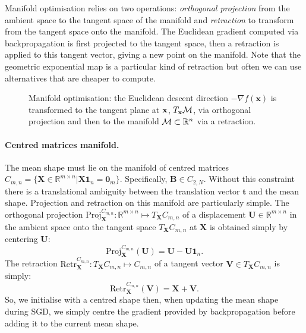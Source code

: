 \documentclass[runningheads]{llncs}
\newcommand{\R}{\mathbb{R}}
\newcommand{\Proj}{\textrm{Proj}}
\newcommand{\Retr}{\textrm{Retr}}
\begin{document}
Manifold optimisation relies on two operations: {\it orthogonal projection} from the ambient space to the tangent space of the manifold and {\it retraction} to transform from the tangent space onto the manifold. The Euclidean gradient computed via backpropagation is first projected to the tangent space, then a retraction is applied to this tangent vector, giving a new point on the manifold. Note that the geometric exponential map is a particular kind of retraction but often we can use alternatives that are cheaper to compute.


\begin{figure}[!t] \centering
\noindent{}
\caption{Manifold optimisation: the Euclidean descent direction $-\nabla f(\mathbf{x})$ is transformed to the tangent plane at ${\bf x}$, $T_{\mathbf{x}}{\cal M}$, via orthogonal projection and then to the manifold ${\cal M}\subset\R^n$ via a retraction.}
\label{fig:manifoldopt}
\end{figure}

\paragraph{Centred matrices manifold.} The mean shape must lie on the manifold of centred matrices $C_{m,n}=\{\mathbf{X}\in\R^{m\times n} | \mathbf{X1}_n=\mathbf{0}_m \}$. Specifically, $\mathbf{B}\in C_{2,N}$. Without this constraint there is a translational ambiguity between the translation vector $\mathbf{t}$ and the mean shape. Projection and retraction on this manifold are particularly simple. The orthogonal projection $\Proj_{\mathbf{X}}^{C_{m,n}}:\R^{m\times n}\mapsto T_{\mathbf{X}}C_{m,n}$ of a displacement $\mathbf{U}\in \R^{m\times n}$ in the ambient space onto the tangent space $T_{\mathbf{X}}C_{m,n}$ at $\mathbf{X}$ is obtained simply by centering $\mathbf{U}$:
\begin{equation}
\Proj_{\mathbf{X}}^{C_{m,n}}(\mathbf{U}) = \mathbf{U}-\mathbf{U1}_n.
\end{equation}
The retraction $\Retr_{\mathbf{X}}^{C_{m,n}}:T_{\mathbf{X}}C_{m,n}\mapsto C_{m,n}$ of a tangent vector $\mathbf{V}\in T_{\mathbf{X}}C_{m,n}$ is simply:
\begin{equation}
\Retr_{\mathbf{X}}^{C_{m,n}}(\mathbf{V}) = \mathbf{X}+\mathbf{V}.
\end{equation}
So, we initialise with a centred shape then, when updating the mean shape during SGD, we simply centre the gradient provided by backpropagation before adding it to the current mean shape.
\end{document}
